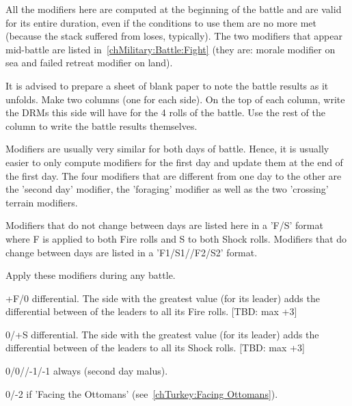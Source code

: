 All the modifiers here are computed at the beginning of the battle and are
valid for its entire duration, even if the conditions to use them are no more
met (because the stack suffered from loses, typically). The two modifiers that
appear mid-battle are listed in~\ref{chMilitary:Battle:Fight} (they are:
morale modifier on sea and failed retreat modifier on land).

\begin{playtip}
  It is advised to prepare a sheet of blank paper to note the battle results
  as it unfolds. Make two columns (one for each side). On the top of each
  column, write the DRMs this side will have for the 4 rolls of the
  battle. Use the rest of the column to write the battle results themselves.

  Modifiers are usually very similar for both days of battle. Hence, it is
  usually easier to only compute modifiers for the first day and update them
  at the end of the first day. The four modifiers that are different from one
  day to the other are the 'second day' modifier, the 'foraging' modifier as
  well as the two 'crossing' terrain modifiers.
\end{playtip}

Modifiers that do not change between days are listed here in a 'F/S' format
where F is applied to both Fire rolls and S to both Shock rolls. Modifiers
that do change between days are listed in a 'F1/S1//F2/S2' format.

 Apply these modifiers during any battle.
\begin{modlist}
\item[+F/0] \Fire differential. The side with the greatest \Fire value (for its
  leader) adds the differential between \Fire of the leaders to all its Fire
  rolls. [TBD: max +3]
\item[0/+S] \Shock differential. The side with the greatest \Shock value (for
  its leader) adds the differential between \Shock of the leaders to all its
  Shock rolls. [TBD: max +3]
\item[0/0//-1/-1] always (second day malus).
\item[0/-2] if 'Facing the Ottomans' (see~\ref{chTurkey:Facing Ottomans}).
\end{modlist}

